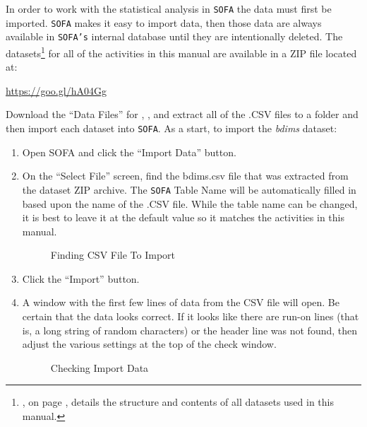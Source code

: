 In order to work with the statistical analysis in \texttt{SOFA} the data must first be imported. \texttt{SOFA} makes it easy to import data, then those data are always available in \texttt{SOFA's} internal database until they are intentionally deleted. The datasets\footnote{, on page \pageref{app:a}, details the structure and contents of all datasets used in this manual.} for all of the activities in this manual are available in a ZIP file located at:

\url{https://goo.gl/hA04Gg}

Download the ``Data Files'' for \myVersion, \myTime, and extract all of the .CSV files to a folder and then import each dataset into \texttt{SOFA}. As a start, to import the \textit{bdims} dataset:

\begin{enumerate}
  \item Open SOFA and click the ``Import Data'' button.
  \item On the ``Select File'' screen, find the bdims.csv file that was extracted from the dataset ZIP archive. The \texttt{SOFA} Table Name will be automatically filled in based upon the name of the .CSV file. While the table name can be changed, it is best to leave it at the default value so it matches the activities in this manual.
  
  \begin{figure}[H]
    \begin{center}
      \caption{Finding CSV File To Import}
    \end{center}
  \end{figure}
  
  \item Click the ``Import'' button.
  \item A window with the first few lines of data from the CSV file will open. Be certain that the data looks correct. If it looks like there are run-on lines (that is, a long string of random characters) or the header line was not found, then adjust the various settings at the top of the check window.
  
  \begin{figure}[H]
    \begin{center}
      \caption{Checking Import Data}
      \label{int:checking_import_data}
    \end{center}
  \end{figure}
  

\end{enumerate}

